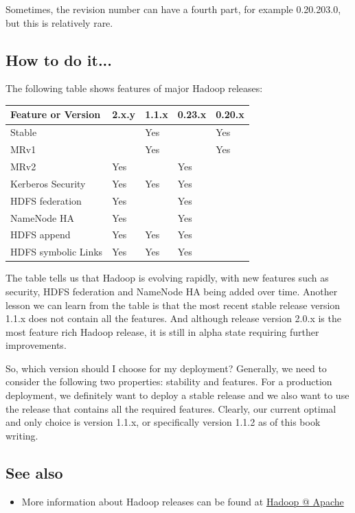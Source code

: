 Sometimes, the revision number can have a fourth part, for example 0.20.203.0, but this is relatively rare.
\subsection*{How to do it...}
The following table shows features of major Hadoop releases:
\begin{table}[h]
  \centering
  \begin{tabular}{l|l|l|l|l}
    \toprule
    \textbf{Feature or Version} & \textbf{2.x.y} & \textbf{1.1.x} & \textbf{0.23.x} & \textbf{0.20.x} \\ \midrule
    Stable &  & Yes &  & Yes \\
    MRv1 &  & Yes &  & Yes \\
    MRv2 & Yes &  & Yes & \\
    Kerberos Security & Yes & Yes & Yes & \\
    HDFS federation & Yes &  & Yes & \\
    NameNode HA & Yes &  & Yes &  \\
    HDFS append & Yes & Yes & Yes & \\
    HDFS symbolic Links & Yes & Yes & Yes & \\ \bottomrule
  \end{tabular}
\end{table}
The table tells us that Hadoop is evolving rapidly, with new features such as security, HDFS federation and NameNode HA being added over time. Another lesson we can learn from the table is that the most recent stable release version 1.1.x does not contain all the features. And although release version 2.0.x is the most feature rich Hadoop release, it is still in alpha state requiring further improvements.

So, which version should I choose for my deployment? Generally, we need to consider the following two properties: stability and features. For a production deployment, we definitely want to deploy a stable release and we also want to use the release that contains all the required features. Clearly, our current optimal and only choice is version 1.1.x, or specifically version 1.1.2 as of this book writing.

\subsection*{See also}
\begin{itemize}
  \item More information about Hadoop releases can be found at \href{http://hadoop.apache.org/releases.html}{Hadoop @ Apache}
\end{itemize}

